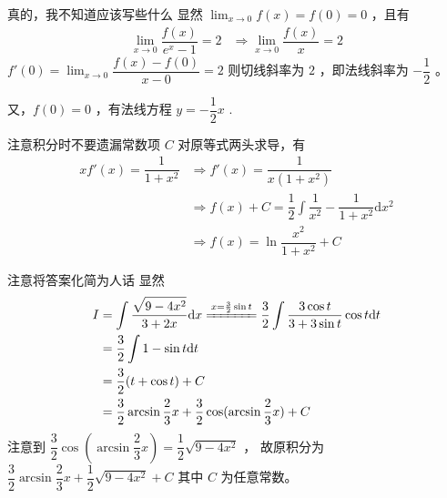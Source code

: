 \begin{answer}[660T49]{真的，我不知道应该写些什么}
    显然 $ {\displaystyle\lim_{x\rightarrow 0}}f(x) = f(0) = 0 $ ，且有
    \begin{equation*}
        \begin{aligned}
            {\displaystyle\lim_{x\rightarrow 0}}\dfrac{f(x)}{e^x - 1} = 2 &\Rightarrow
            {\displaystyle\lim_{x\rightarrow 0}}\dfrac{f(x)}{x} = 2
        \end{aligned}
    \end{equation*}
    $ f'(0) = {\displaystyle\lim_{x\rightarrow 0}}\dfrac{f(x) - f(0)}{x - 0} = 2 $ 
    则切线斜率为 $ 2 $ ，即法线斜率为 $ -\dfrac{1}{2} $ 。
    
    又，$ f(0) = 0 $ ，有法线方程
    $ y = -\dfrac{1}{2}x $ .
\end{answer}

\begin{answer}[660T51]{注意积分时不要遗漏常数项 $ C $ }
    对原等式两头求导，有
    \begin{equation*}
        \begin{aligned}
            xf'(x) = \dfrac{1}{1+x^2} &\Rightarrow f'(x) = \dfrac{1}{x(1+x^2)}
            \\&\Rightarrow f(x) + C = \dfrac{1}{2} \int \dfrac{1}{x^2} - \dfrac{1}{1+x^2} \mathrm{d}x^2
            \\&\Rightarrow f(x) = \ln\dfrac{x^2}{1+x^2} + C
        \end{aligned}
    \end{equation*}
\end{answer}

\begin{answer}[660T52]{注意将答案化简为人话}
    显然\begin{equation*}
        \begin{aligned}
            I & = \int \dfrac{\dsqrt{9-4x^2}}{3+2x}\mathrm{d}x 
            \xlongequal{x = \frac{3}{2}\sin t} \dfrac{3}{2}
            \int \dfrac{3\cos t}{3+3\sin t} \cos t\mathrm{d}t
            \\&= \dfrac{3}{2}\int 1 - \sin t\mathrm{d}t \\&=
            \dfrac{3}{2}(t + \cos t) + C 
            \\&= \dfrac{3}{2}\arcsin \dfrac{2}{3}x + \dfrac{3}{2}\cos (\arcsin \dfrac{2}{3}x) + C
        \end{aligned}
    \end{equation*}
    注意到 $ \dfrac{3}{2}\cos (\arcsin \dfrac{2}{3}x) = \dfrac{1}{2}\sqrt{9-4x^2} $ ，
    故原积分为 $ \dfrac{3}{2}\arcsin \dfrac{2}{3}x + \dfrac{1}{2}\sqrt{9-4x^2} + C $ 
    其中 $ C $ 为任意常数。
\end{answer}

